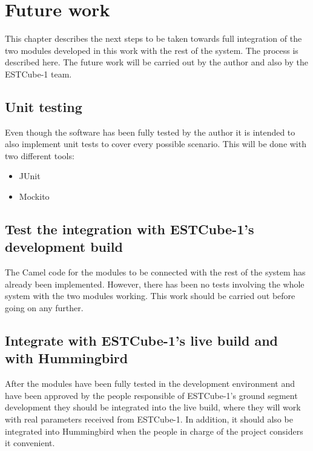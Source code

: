\chapter{Future work}

This chapter describes the next steps to be taken towards full integration of the two modules developed in this work with the rest of the system. The process is described here. The future work will be carried out by the author and also by the ESTCube-1 team.


\section{Unit testing}
Even though the software has been fully tested by the author it is intended to also implement unit tests to cover every possible scenario. This will be done with two different tools:
\begin{itemize}
\item JUnit\cite{JUnit}
\item Mockito\cite{Mockito}
\end{itemize}


\section{Test the integration with ESTCube-1's development build}
The Camel code for the modules to be connected with the rest of the system has already been implemented. However, there has been no tests involving the whole system with the two modules working. This work should be carried out before going on any further.

\section{Integrate with ESTCube-1's live build and with Hummingbird}
After the modules have been fully tested in the development environment and have been approved by the people responsible of ESTCube-1's ground segment development they should be integrated into the live build, where they will work with real parameters received from ESTCube-1. In addition, it should also be integrated into Hummingbird when the people in charge of the project considers it convenient.




\newpage


